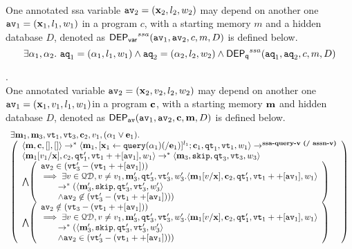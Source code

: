 {\begin{defn}
\label{def:qvar_dep}
\\
{
One annotated ssa variable $\mathtt{av}_2 = ({\boldsymbol{\mathbf{x}}}_2,l_2, w_2)$ may depend on another one 
$\mathtt{av}_1 = ({\boldsymbol{\mathbf{x}}}_1, l_1, w_1)$ in a program $c$,
with a starting memory $m$ and a hidden database $D$, denoted as 
%
$\mathsf{DEP_{var}}^{ssa}(\mathtt{av}_1, \mathtt{av}_2, c, m, D)$ is defined below. 
%
\[
\exists \alpha_1, \alpha_2. ~
\mathtt{aq}_1 = (\alpha_1, l_1, w_1)
\land
\mathtt{aq}_2 = (\alpha_2, l_2, w_2)
\land 
\mathsf{DEP_{q}}^{ssa}(\mathtt{aq}_1, \mathtt{aq}_2, c, m, D)
\]
}
\end{defn}
%
\begin{defn}
\label{def:avar_dep}.
\\
{
One annotated variable $\mathtt{av}_2 = ({\boldsymbol{\mathbf{x}}}_2, v_2, l_2, w_2)$ may depend on another one  $\mathtt{av}_1 = ({\boldsymbol{\mathbf{x}}}_1, v_1, l_1, w_1)$in a program ${\boldsymbol{\mathbf{c}}}$,
with a starting memory ${\boldsymbol{\mathbf{m}}}$ and  hidden database $D$, denoted as 
%
$\mathsf{DEP_{\mathtt{av}}}(\mathtt{av}_1, \mathtt{av}_2, {\boldsymbol{\mathbf{c}}}, {\boldsymbol{\mathbf{m}}}, D)$ is defined below. 
%
%
\[
\begin{array}{l}
\exists \ssa{m}_1, \ssa{m}_3, \vtrace_1, \vtrace_3, \ssa{c}_2, v_1, ({\qval}_1 \lor \sexpr_1).\\
  \left (\begin{array}{l}   
\config{\ssa{m}, \ssa{c}, [], []} \rightarrow^{*} 
\config{\ssa{m}_1, [\assign{\ssa{x}_1}{\query({\qval}_1) (/ \sexpr_1)}]^{l_1} ; \ssa{c}_1, \qtrace_1,  \vtrace_1, w_1} 
\rightarrow^{\textbf{ssa-query-v (/ assn-v)}} 
\\ 
\config{\ssa{m}_1[v_1/\ssa{x}], c_2, \qtrace_1', \vtrace_1 ++ [\av_1], w_1} 
\rightarrow^{*} \config{\ssa{m}_3, \eskip, \qtrace_3, \vtrace_3, w_3}
 \\ \bigwedge
  \left( 
  \begin{array}{l}
  \av_2 \in (\vtrace_3'-(\vtrace_1 ++ [\av_1])) 
  \\
  \implies 
  \exists v \in \qdom, v \neq v_1, \ssa{m}_3', \qtrace_3', \vtrace_3', w_3'.  
  \config{\ssa{m}_1[v/\ssa{x}], {\ssa{c}_2}, \qtrace_1', \vtrace_1 ++ [\av_1], w_1} 
  \\ 
  \quad \quad 
  \rightarrow^{*}
  (\config{\ssa{m}_3', \eskip, \qtrace_3', \vtrace_3', w_3'} 
		\\ 
		\quad \quad 
  \land 
  \av_2 \not\in (\vtrace_3'-(\vtrace_1 ++ [\av_1])))
\end{array} \right )
\\\bigwedge
\left( 
  \begin{array}{l}
  	\av_2 \notin (\vtrace_3 - (\vtrace_1 ++ [\av_1]))
  	\\
  	\implies 
	\exists v \in \qdom, v \neq v_1, \ssa{m}_3', \qtrace_3', \vtrace_3', w_3'. 
	\config{\ssa{m}_1[v /\ssa{x}], {\ssa{c}_2}, \qtrace_1', \vtrace_1 ++ [\av_1], w_1}
	\\ 
	\quad \quad 
	\rightarrow^{*} 
	(\config{\ssa{m}_3', \eskip, \qtrace_3', \vtrace_3', w_3'} 
		\\ 
		\quad \quad 
	\land 
	\av_2  \in (\vtrace_3' - (\vtrace_1 ++ [\av_1])))
\end{array} \right )
\end{array} \right )
\end{array}
\]
%
}
\end{defn}

}
